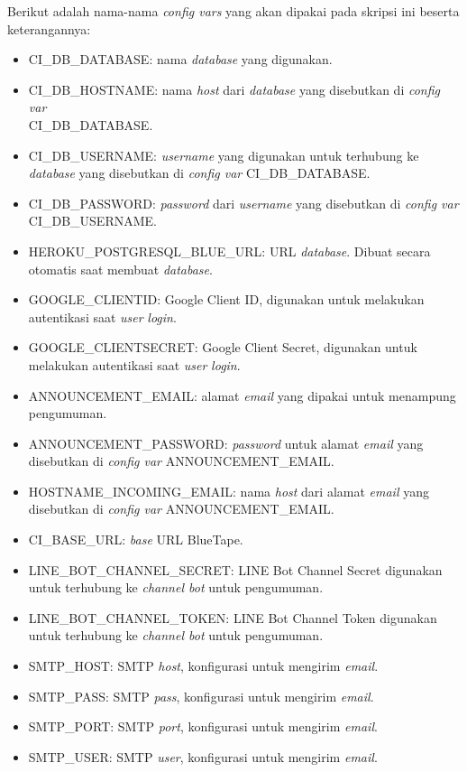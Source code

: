 		Berikut adalah nama-nama \textit{config vars} yang akan dipakai pada skripsi ini beserta keterangannya: 
		\begin{itemize}
			\item CI\_DB\_DATABASE: nama \textit{database} yang digunakan.
			\item CI\_DB\_HOSTNAME: nama \textit{host} dari \textit{database} yang disebutkan di \textit{config var} \\
			CI\_DB\_DATABASE.
			\item CI\_DB\_USERNAME: \textit{username} yang digunakan untuk terhubung ke \textit{database} yang disebutkan di \textit{config var} CI\_DB\_DATABASE.
			\item CI\_DB\_PASSWORD: \textit{password} dari \textit{username} yang disebutkan di \textit{config var} \\
			CI\_DB\_USERNAME.
			\item HEROKU\_POSTGRESQL\_BLUE\_URL: URL \textit{database}. Dibuat secara otomatis saat membuat \textit{database}.
			\item GOOGLE\_CLIENTID: Google Client ID, digunakan untuk melakukan autentikasi saat \textit{user} \textit{login}.
			\item GOOGLE\_CLIENTSECRET: Google Client Secret, digunakan untuk melakukan autentikasi saat \textit{user} \textit{login}.
			\item ANNOUNCEMENT\_EMAIL: alamat \textit{email} yang dipakai untuk menampung pengumuman.
			\item ANNOUNCEMENT\_PASSWORD: \textit{password} untuk alamat \textit{email} yang disebutkan di \textit{config var} ANNOUNCEMENT\_EMAIL.
			\item HOSTNAME\_INCOMING\_EMAIL: nama \textit{host} dari alamat \textit{email} yang disebutkan di \textit{config var} ANNOUNCEMENT\_EMAIL.
			\item CI\_BASE\_URL: \textit{base} URL BlueTape.
			\item LINE\_BOT\_CHANNEL\_SECRET: LINE Bot Channel Secret digunakan untuk terhubung ke \textit{channel bot} untuk pengumuman.
			\item LINE\_BOT\_CHANNEL\_TOKEN: LINE Bot Channel Token digunakan untuk terhubung ke \textit{channel bot} untuk pengumuman.
			\item SMTP\_HOST: SMTP \textit{host}, konfigurasi untuk mengirim \textit{email}.
			\item SMTP\_PASS: SMTP \textit{pass}, konfigurasi untuk mengirim \textit{email}.
			\item SMTP\_PORT: SMTP \textit{port}, konfigurasi untuk mengirim \textit{email}.
			\item SMTP\_USER: SMTP \textit{user}, konfigurasi untuk mengirim \textit{email}.
		\end{itemize}
		
